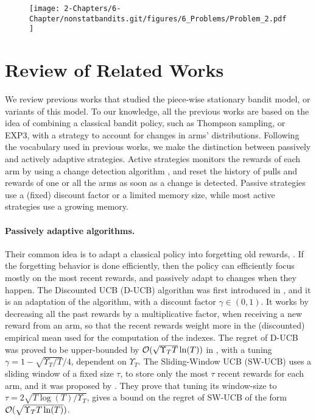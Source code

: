 \begin{figure}[h!]  %
    \centering
    \texttt{[image: 2-Chapters/6-Chapter/nonstatbandits.git/figures/6\_Problems/Problem\_2.pdf]}
    \label{fig:6:Problem_2}
\end{figure}


\section{Review of Related Works}
\label{sec:6:relatedWork}

We review previous works that studied the piece-wise stationary bandit model, or variants of this model.
To our knowledge, all the previous works are based on the idea of combining a classical bandit policy, such as Thompson sampling, \UCB{} or EXP3, with a strategy to account for changes in arms' distributions.
Following the vocabulary used in previous works, we make the distinction between passively and actively adaptive strategies.
Active strategies monitors the rewards of each arm by using a change detection algorithm \cite{Basseville93}, and reset the history of pulls and rewards of one or all the arms as soon as a change is detected.
Passive strategies use a (fixed) discount factor or a limited memory size, while most active strategies use a growing memory.


\paragraph{Passively adaptive algorithms.}
%
Their common idea is to adapt a classical policy into forgetting old rewards, .
If the forgetting behavior is done efficiently, then the policy can efficiently focus mostly on the most recent rewards, and passively adapt to changes when they happen.
%
The Discounted UCB (D-UCB) algorithm was first introduced in \cite{Kocsis06}, and it is an adaptation of the \UCB{} algorithm, with a discount factor $\gamma\in(0,1)$. It works by decreasing all the past rewards by a multiplicative factor, when receiving a new reward from an arm, so that the recent rewards weight more in the (discounted) empirical mean used for the computation of the \UCB{} indexes.
The regret of D-UCB was proved to be upper-bounded by $\mathcal{O}(\sqrt{\Upsilon_T T }\ln(T))$ in \cite{Garivier11UCBDiscount}, with a tuning $\gamma = 1 - \sqrt{\Upsilon_T/T}/4$, dependent on $\Upsilon_T$.
%
The Sliding-Window UCB (SW-UCB) uses a sliding window of a fixed size $\tau$, to store only the most $\tau$ recent rewards for each arm,
and it was proposed by \cite{Garivier11UCBDiscount}.
They prove that tuning its window-size to $\tau = 2 \sqrt{T\log(T)/\Upsilon_T}$, gives a bound on the regret of SW-UCB of the form $\mathcal{O}(\sqrt{\Upsilon_T T \ln(T)})$.

